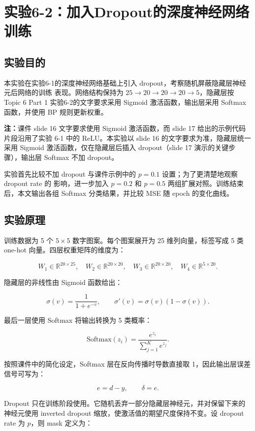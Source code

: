 \documentclass[10.5pt]{config}
\date{\today}
\begin{document}
\makeheader

\section{实验6-2：加入Dropout的深度神经网络训练}

\subsection{实验目的}

本实验在实验6-1的深度神经网络基础上引入 dropout，考察随机屏蔽隐藏层神经元后网络的训练
表现。网络结构保持为 $25\rightarrow20\rightarrow20\rightarrow20\rightarrow5$，隐藏层按
Topic 6 Part 1 实验6-2的文字要求采用 Sigmoid 激活函数，输出层采用 Softmax 函数，并使用
BP 规则更新权重。

\noindent\textbf{注：}课件 slide 16 文字要求使用 Sigmoid 激活函数，而 slide 17 给出的示例代码片段沿用了实验 6-1 中的 ReLU。本实验以 slide 16 的文字要求为准，隐藏层统一采用 Sigmoid 激活函数，仅在隐藏层后插入 dropout（slide 17 演示的关键步骤），输出层 Softmax 不加 dropout。

实验首先比较不加 dropout 与课件示例中的 $p=0.1$ 设置；为了更清楚地观察 dropout rate 的
影响，进一步加入 $p=0.2$ 和 $p=0.5$ 两组扩展对照。训练结束后，本文输出各组 Softmax
分类结果，并比较 MSE 随 epoch 的变化曲线。

\subsection{实验原理}

训练数据为 5 个 $5\times5$ 数字图案。每个图案展开为 25 维列向量，标签写成 5 类 one-hot
向量。四层权重矩阵的维度为：

\[
W_1\in\mathbb{R}^{20\times25},\quad
W_2\in\mathbb{R}^{20\times20},\quad
W_3\in\mathbb{R}^{20\times20},\quad
W_4\in\mathbb{R}^{5\times20}.
\]

隐藏层的非线性由 Sigmoid 函数给出：

\[
\sigma(v)=\frac{1}{1+e^{-v}},\qquad
\sigma'(v)=\sigma(v)(1-\sigma(v)).
\]

最后一层使用 Softmax 将输出转换为 5 类概率：

\[
\mathrm{Softmax}(z_i)=\frac{e^{z_i}}{\sum_{j=1}^{K}e^{z_j}}.
\]

按照课件中的简化设定，Softmax 层在反向传播时导数直接取 1，因此输出层误差信号可写为：

\[
e=d-y,\qquad \delta=e.
\]

Dropout 只在训练阶段使用。它随机丢弃一部分隐藏层神经元，并对保留下来的神经元使用
inverted dropout 缩放，使激活值的期望尺度保持不变。设 dropout rate 为 $p$，则 mask
定义为：
\end{document}
